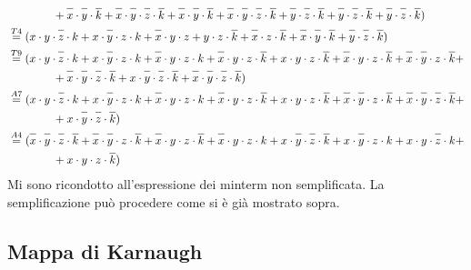 \documentclass{article}
\newcommand*{\oline}[1]{\overline{#1\mathstrut}}
\newcommand{\bigspace}{\quad\quad\quad\quad}
\begin{document}
\begin{align*}
  &\bigspace + \oline{x} \cdot \oline{y} \cdot \oline{k} + \oline{x} \cdot \oline{y} \cdot \oline{z} \cdot \oline{k} + \oline{x} \cdot \oline{y} \cdot \oline{k} + \oline{x} \cdot \oline{y} \cdot \oline{z} \cdot \oline{k} + \oline{y} \cdot \oline{z} \cdot \oline{k} + \oline{y} \cdot \oline{z} \cdot \oline{k} + \oline{y} \cdot \oline{z} \cdot \oline{k})\\
  &\overset{T4}{=} (x \cdot y \cdot \oline{z} \cdot k + x \cdot \oline{y} \cdot z \cdot k + \oline{x} \cdot y \cdot z + y \cdot z \cdot \oline{k} + \oline{x} \cdot z \cdot \oline{k} + \oline{x} \cdot \oline{y} \cdot \oline{k} + \oline{y} \cdot \oline{z} \cdot \oline{k})\\
  &\overset{T9}{=} (x \cdot y \cdot \oline{z} \cdot k + x \cdot \oline{y} \cdot z \cdot k + \oline{x} \cdot y \cdot z \cdot k + \oline{x} \cdot y \cdot z \cdot \oline{k} + x \cdot y \cdot z \cdot \oline{k} + \oline{x} \cdot y \cdot z \cdot \oline{k} + \oline{x} \cdot \oline{y} \cdot z \cdot \oline{k} +\\
  &\bigspace + \oline{x} \cdot \oline{y} \cdot \oline{z} \cdot \oline{k} + x \cdot \oline{y} \cdot \oline{z} \cdot \oline{k} + \oline{x} \cdot \oline{y} \cdot \oline{z} \cdot \oline{k})\\
  &\overset{A7}{=} (x \cdot y \cdot \oline{z} \cdot k + x \cdot \oline{y} \cdot z \cdot k + \oline{x} \cdot y \cdot z \cdot k + \oline{x} \cdot y \cdot z \cdot \oline{k} + x \cdot y \cdot z \cdot \oline{k} + \oline{x} \cdot \oline{y} \cdot z \cdot \oline{k} + \oline{x} \cdot \oline{y} \cdot \oline{z} \cdot \oline{k} +\\
  &\bigspace + x \cdot \oline{y} \cdot \oline{z} \cdot \oline{k})\\
  &\overset{A4}{=} (\oline{x} \cdot \oline{y} \cdot \oline{z} \cdot \oline{k} + \oline{x} \cdot \oline{y} \cdot z \cdot \oline{k} + \oline{x} \cdot y \cdot z \cdot \oline{k} + \oline{x} \cdot y \cdot z \cdot k + x \cdot \oline{y} \cdot \oline{z} \cdot \oline{k} + x \cdot \oline{y} \cdot z \cdot k + x \cdot y \cdot \oline{z} \cdot k +\\
  &\bigspace + x \cdot y \cdot z \cdot \oline{k})\\
\end{align*}
Mi sono ricondotto all'espressione dei minterm non semplificata. La semplificazione può procedere come si è già mostrato sopra.

\subsection*{Mappa di Karnaugh}
\end{document}
